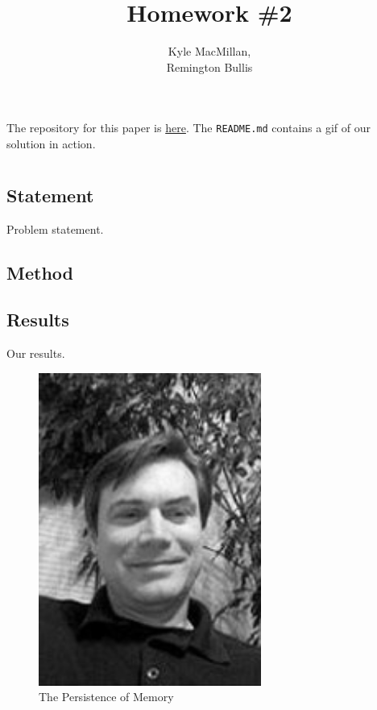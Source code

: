 \documentclass[12pt]{article}
\title{Homework \#2}
\author{Kyle MacMillan, \\Remington Bullis}
\begin{document}
\maketitle

The repository for this paper is \href{https://github.com/macattackftw/ncGA}{here}. 
The \texttt{README.md} contains a gif of our solution in action.

\section{} %

\subsection{Statement}
Problem statement.

\subsection{Method}


\newpage
\subsection{Results}
Our results.

\begin{figure}[H]
\centering
\noindent\includegraphics[width=0.65\textwidth]{./images/jmcgough}
\caption{The Persistence of Memory}
\label{fig:jmcgough}
\end{figure}
\end{document}
